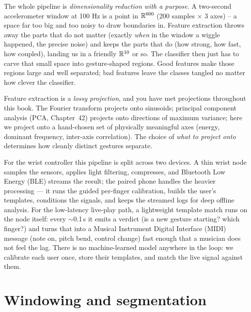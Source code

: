 \begin{intuitionbox}
The whole pipeline is \emph{dimensionality reduction with a
purpose}. A two-second accelerometer window at 100 Hz is a point in
$\mathbb{R}^{600}$ (200 samples $\times$ 3 axes) -- a space far too big and too noisy to
draw boundaries in. Feature extraction throws away the parts that do not matter
(exactly \emph{when} in the window a wiggle happened, the precise noise) and keeps
the parts that do (how strong, how fast, how coupled), landing us in a friendly
$\mathbb{R}^{10}$ or so. The classifier then just has to carve that small space into
gesture-shaped regions. Good features make those regions large and well
separated; bad features leave the classes tangled no matter how clever the
classifier.
\end{intuitionbox}

\begin{connectionbox}
Feature extraction is a \emph{lossy projection}, and you have met projections
throughout this book. The Fourier
transform projects onto sinusoids; principal component analysis (PCA, Chapter~42) projects
onto directions of maximum variance; here we project onto a hand-chosen set of
physically meaningful axes (energy, dominant frequency, inter-axis correlation).
The choice of \emph{what to project onto} determines how cleanly distinct gestures separate.
\end{connectionbox}

\begin{goalbox}
For the wrist controller this pipeline is split across two devices. A thin wrist
node samples the sensors, applies light filtering, compresses, and Bluetooth Low
Energy (BLE) streams the result; the paired phone handles the heavier processing ---
it runs the guided per-finger calibration, builds the user's templates, conditions
the signals, and keeps the streamed logs for deep offline analysis. For the
low-latency live-play path, a lightweight template match runs on the node itself:
every $\sim$0.1\,s it emits a verdict (is a new gesture starting? which finger?)
and turns that into a Musical Instrument Digital Interface (MIDI) message (note on,
pitch bend, control change) fast enough that a musician does not feel the lag.
There is no machine-learned model anywhere in the loop: we calibrate each user once,
store their templates, and match the live signal against them.
\end{goalbox}

\section{Windowing and segmentation}
\label{ch38:windowing}

